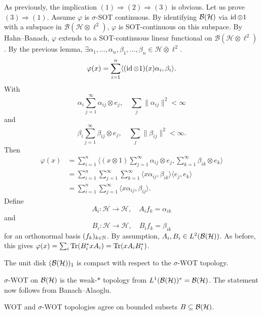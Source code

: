 \begin{myproof}
  As previously, the implication $(1) \Rightarrow (2) \Rightarrow (3)$ is obvious.
  Let us prove $(3) \Rightarrow (1)$. Assume $\varphi$ is $\sigma$-SOT continuous.
  By identifying $\operatorname{\mathcal{B} (\mathcal{H})}$ via $\operatorname{id} \otimes 1$ with a subspace in $\mathcal{B} (\mathcal{H} \otimes \ell^2)$,
  $\varphi$ is SOT-continuous on this subspace. By Hahn--Banach, $\varphi$ extends to a SOT-continuous 
  linear functional on $\mathcal{B} (\mathcal{H} \otimes \ell^2)$.
  By the previous lemma, $\exists \alpha_1, \dots, \alpha_n, \beta_1, \dots, \beta_n \in \mathcal{H} \overline{\otimes} \ell^2$.
  $$\varphi(x) = \sum_{i = 1} ^n \langle (\operatorname{id} \otimes 1) (x) \alpha_i, \beta_i \rangle.$$
  With 
  $$\alpha_i \sum_{j = 1} ^\infty \alpha_{ij} \otimes e_j, \quad \sum_j \| \alpha_{ij} \|^2 < \infty$$
  and 
  $$\beta_i \sum_{j = 1} ^\infty \beta_{ij} \otimes e_j, \quad \sum_j \| \beta_{ij} \|^2 < \infty.$$
  Then 
  \begin{align*}
    \varphi(x) &= \sum_{i = 1} ^n \langle (x \otimes 1) \sum_{j = 1} ^\infty \alpha_{ij} \otimes e_j, \sum_{k = 1} ^\infty \beta_{ik} \otimes e_k\rangle\\
    &= \sum_{i = 1} ^n \sum_{j = 1} ^\infty \sum_{k = 1} ^\infty \langle x \alpha_{ij}, \beta_{ik}\rangle \langle e_j, e_k\rangle\\
    &= \sum_{i = 1} ^n \sum_{j = 1} ^\infty \langle x \alpha_{ij}, \beta_{ij}\rangle.
  \end{align*}
  Define $$A_i : \mathcal{H} \to \mathcal{H},\quad A_i f_k = \alpha_{ik}$$
  and $$B_i : \mathcal{H} \to \mathcal{H},\quad B_i f_k = \beta_{ik}$$
  for an orthonormal basis $(f_k)_{k \in \mathbb {N}}$. By assumption, $A_i, B_i \in L^2 (\operatorname{\mathcal{B} (\mathcal{H})})$.
  As before, this gives $\varphi (x) = \sum_i \operatorname{Tr} (B_i ^* x A_i) = \operatorname{Tr} (x A_i B_i^*)$.
\end{myproof}

\begin{corollary}\label{cor:4.2}
  The unit disk $(\operatorname{\mathcal{B} (\mathcal{H})})_1$ is compact with respect to the $\sigma$-WOT topology.
\end{corollary}

\begin{myproof}
  $\sigma$-WOT on $\operatorname{\mathcal{B} (\mathcal{H})}$ is the weak-$*$ topology from $L^1 (\operatorname{\mathcal{B} (\mathcal{H})})^* = \operatorname{\mathcal{B} (\mathcal{H})}$.
  The statement now follows from Banach--Alaoglu.
\end{myproof}

\begin{corollary}\label{cor:4.3}
  WOT and $\sigma$-WOT topologies agree on bounded subsets $B \subseteq \operatorname{\mathcal{B} (\mathcal{H})}$.
\end{corollary}

